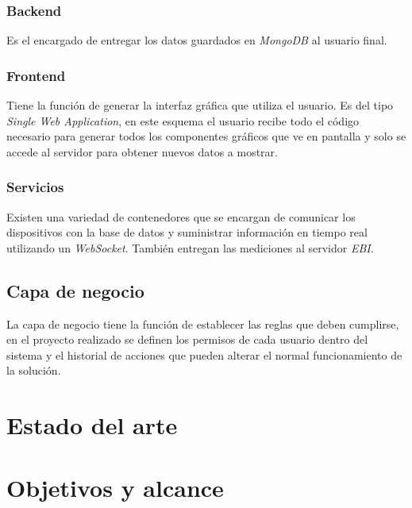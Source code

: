 		\subsubsection{Backend}
		
			Es el encargado de entregar los datos guardados en \emph{MongoDB} al usuario final.
		
		\subsubsection{Frontend}
		
			Tiene la función de generar la interfaz gráfica que utiliza el usuario. Es del tipo \emph{Single Web Application}, en este esquema el usuario recibe todo el código necesario para generar todos los componentes gráficos que ve en pantalla y solo se accede al servidor para obtener nuevos datos a mostrar.
		
		\subsubsection{Servicios}
		
			Existen una variedad de contenedores que se encargan de comunicar los dispositivos con la base de datos y suministrar información en tiempo real utilizando un \emph{WebSocket}. También entregan las mediciones al servidor \emph{EBI}.
	
	\subsection{Capa de negocio}
	\label{capaNegocio}
	
		La capa de negocio tiene la función de establecer las reglas que deben cumplirse, en el proyecto realizado se definen los permisos de cada usuario dentro del sistema y el historial de acciones que pueden alterar el normal funcionamiento de la solución.

\section{Estado del arte}
\label{estadoArte}

\section{Objetivos y alcance}
\label{objetivos}
